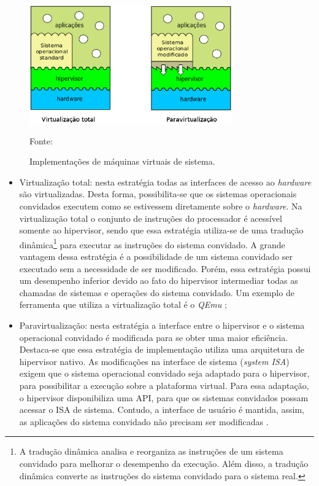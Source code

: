 \begin{figure}[h!]
 \centering
 \includegraphics[width=330px]{img/vms_implementacao.eps}
 \caption{Implementações de máquinas virtuais de sistema.}
 \label{fig:vms_implementacao}
 Fonte: \citet{maziero2013}
\end{figure}

\begin{itemize}
 \item Virtualização total: nesta estratégia todas as interfaces de acesso ao \textit{hardware} são virtualizadas. Desta forma, possibilita-se 
 que os sistemas operacionais convidados executem como se estivessem diretamente sobre o \textit{hardware}. Na virtualização total o conjunto de 
 instruções do processador é acessível somente ao hipervisor, sendo que essa estratégia utiliza-se de uma tradução dinâmica\footnote[1]{A tradução 
 dinâmica analisa e reorganiza as instruções de um sistema convidado para melhorar o desempenho da execução. Além disso, a tradução dinâmica 
 converte as instruções do sistema convidado para o sistema real.} para executar as instruções do sistema convidado. A grande vantagem dessa 
 estratégia é a possibilidade de um sistema convidado ser executado sem a necessidade de ser modificado. Porém, essa estratégia possui um 
 desempenho inferior devido ao fato do hipervisor intermediar todas as chamadas de sistemas e operações do sistema convidado. Um exemplo de 
 ferramenta que utiliza a virtualização total é o \textit{QEmu} \cite{qemu};
 \item Paravirtualização: nesta estratégia a interface entre o hipervisor e o sistema operacional convidado é modificada para se obter uma 
 maior eficiência. Destaca-se que essa estratégia de implementação utiliza uma arquitetura de hipervisor nativo. 
 As modificações na interface de sistema (\textit{system \ac{ISA}}) exigem que o sistema operacional convidado seja adaptado para o hipervisor, 
 para possibilitar a execução sobre a plataforma virtual. Para essa adaptação, o hipervisor disponibiliza uma \ac{API}, para que os 
 sistemas convidados possam acessar o \ac{ISA} de sistema. Contudo, a interface de usuário é mantida, assim, as aplicações do sistema convidado 
 não precisam ser modificadas \cite{maziero2013}.
\end{itemize}

